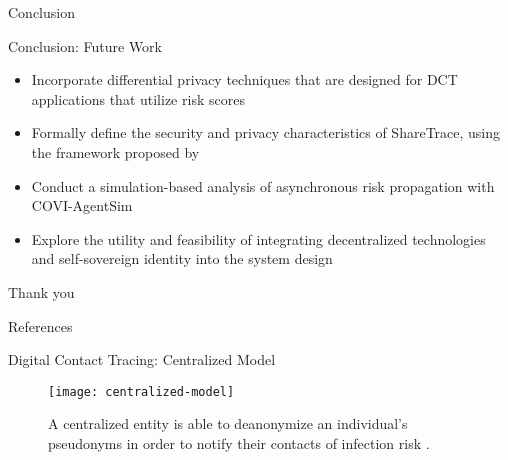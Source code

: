 \documentclass[11pt]{beamer}
\begin{document}
\begin{section}{Conclusion}

\begin{frame}{Conclusion: Future Work}
\begin{itemize}
  \item Incorporate differential privacy techniques that are designed for DCT applications that utilize risk scores \citep{Romijnders2024}
  \pause
  \item Formally define the security and privacy characteristics of ShareTrace, using the framework proposed by \citet{Kuhn2021}
  \pause
  \item Conduct a simulation-based analysis of asynchronous risk propagation with COVI-AgentSim \citep{Gupta2020}
  \pause
  \item Explore the utility and feasibility of integrating decentralized technologies \citep{Troncoso2017, Trautwein2022, Shi2024, Keizer2024} and self-sovereign identity \citep{Preukschat2021} into the system design
\end{itemize}
\end{frame}

\begin{frame}[c]{ }
  \centering
  \Huge
  Thank you
\end{frame}

\end{section}

\begin{frame}[allowframebreaks]{References}
  \printbibliography
\end{frame}

\appendix

\begin{frame}{Digital Contact Tracing: Centralized Model}
\begin{figure}
  \centering
  \texttt{[image: centralized-model]}
  \caption[Centralized model]{A centralized entity is able to deanonymize an individual's pseudonyms in order to notify their contacts of infection risk \cite{Reichert2021}.}
\end{figure}
\end{frame}
\end{document}
